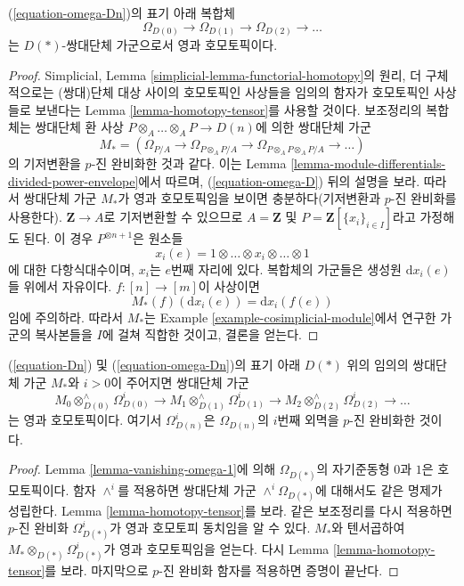 \begin{lemma}
\label{lemma-vanishing-omega-1}
(\ref{equation-omega-Dn})의 표기 아래 복합체
$$
\Omega_{D(0)} \to \Omega_{D(1)} \to \Omega_{D(2)} \to \ldots
$$
는 $D(*)$-쌍대단체 가군으로서 영과 호모토픽이다.
\end{lemma}

\begin{proof}
Simplicial, Lemma \ref{simplicial-lemma-functorial-homotopy}의 원리,
더 구체적으로는 (쌍대)단체 대상 사이의 호모토픽인 사상들을 임의의
함자가 호모토픽인 사상들로 보낸다는 Lemma
\ref{lemma-homotopy-tensor}를 사용할 것이다. 보조정리의 복합체는
쌍대단체 환 사상 $P\otimes_A \ldots \otimes_A P \to D(n)$에 의한
쌍대단체 가군
$$
M_* = \left(
\Omega_{P/A} \to
\Omega_{P \otimes_A P/A} \to
\Omega_{P \otimes_A P \otimes_A P/A} \to \ldots
\right)
$$
의 기저변환을 $p$-진 완비화한 것과 같다. 이는 Lemma
\ref{lemma-module-differentials-divided-power-envelope}에서 따르며,
(\ref{equation-omega-D}) 뒤의 설명을 보라. 따라서 쌍대단체 가군
$M_*$가 영과 호모토픽임을 보이면 충분하다(기저변환과 $p$-진
완비화를 사용한다). $\mathbf{Z} \to A$로 기저변환할 수 있으므로
$A = \mathbf{Z}$ 및 $P = \mathbf{Z}[\{x_i\}_{i \in I}]$라고
가정해도 된다. 이 경우 $P^{\otimes n + 1}$은 원소들
$$
x_i(e) = 1 \otimes \ldots \otimes x_i \otimes \ldots \otimes 1
$$
에 대한 다항식대수이며, $x_i$는 $e$번째 자리에 있다. 복합체의
가군들은 생성원 $\text{d}x_i(e)$들 위에서 자유이다.
$f : [n] \to [m]$이 사상이면
$$
M_*(f)(\text{d}x_i(e)) = \text{d}x_i(f(e))
$$
임에 주의하라. 따라서 $M_*$는 Example
\ref{example-cosimplicial-module}에서 연구한 가군의 복사본들을
$I$에 걸쳐 직합한 것이고, 결론을 얻는다.
\end{proof}

\begin{lemma}
\label{lemma-vanishing}
(\ref{equation-Dn}) 및 (\ref{equation-omega-Dn})의 표기 아래
$D(*)$ 위의 임의의 쌍대단체 가군 $M_*$와 $i > 0$이 주어지면
쌍대단체 가군
$$
M_0 \otimes^\wedge_{D(0)} \Omega^i_{D(0)} \to
M_1 \otimes^\wedge_{D(1)} \Omega^i_{D(1)} \to
M_2 \otimes^\wedge_{D(2)} \Omega^i_{D(2)} \to \ldots
$$
는 영과 호모토픽이다. 여기서 $\Omega^i_{D(n)}$은
$\Omega_{D(n)}$의 $i$번째 외멱을 $p$-진 완비화한 것이다.
\end{lemma}

\begin{proof}
Lemma \ref{lemma-vanishing-omega-1}에 의해 $\Omega_{D(*)}$의
자기준동형 $0$과 $1$은 호모토픽이다. 함자 $\wedge^i$를 적용하면
쌍대단체 가군 $\wedge^i\Omega_{D(*)}$에 대해서도 같은 명제가
성립한다. Lemma \ref{lemma-homotopy-tensor}를 보라. 같은 보조정리를
다시 적용하면 $p$-진 완비화 $\Omega^i_{D(*)}$가 영과 호모토피
동치임을 알 수 있다. $M_*$와 텐서곱하여
$M_* \otimes_{D(*)} \Omega^i_{D(*)}$가 영과 호모토픽임을 얻는다.
다시 Lemma \ref{lemma-homotopy-tensor}를 보라. 마지막으로 $p$-진
완비화 함자를 적용하면 증명이 끝난다.
\end{proof}




